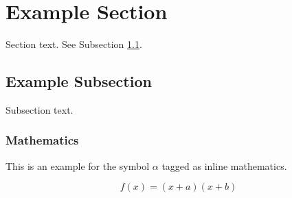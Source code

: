 \documentclass[authoryear,preprint,review,12pt]{elsarticle}
\begin{document}


\section{Example Section}
\label{sec1}

Section text. See Subsection \ref{subsec1}.

\subsection{Example Subsection}
\label{subsec1}

Subsection text.


\subsubsection{Mathematics}
This is an example for the symbol $\alpha$ tagged as inline mathematics.

\begin{equation}
f(x) = (x+a)(x+b)
\end{equation}
\end{document}
